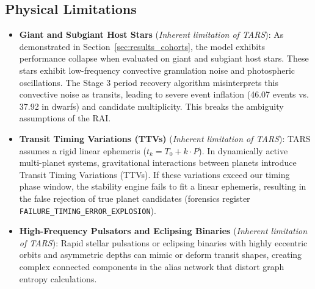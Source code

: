 \subsection{Physical Limitations} \label{sec:limit_physical}
\begin{itemize}
\item \textbf{Giant and Subgiant Host Stars} (\textit{Inherent limitation of TARS}): As demonstrated in Section~\ref{sec:results_cohorts}, the model exhibits performance collapse when evaluated on giant and subgiant host stars. These stars exhibit low-frequency convective granulation noise and photospheric oscillations. The Stage 3 period recovery algorithm misinterprets this convective noise as transits, leading to severe event inflation (46.07 events vs. 37.92 in dwarfs) and candidate multiplicity. This breaks the ambiguity assumptions of the RAI.
\item \textbf{Transit Timing Variations (TTVs)} (\textit{Inherent limitation of TARS}): TARS assumes a rigid linear ephemeris ($t_k = T_0 + k \cdot P$). In dynamically active multi-planet systems, gravitational interactions between planets introduce Transit Timing Variations (TTVs). If these variations exceed our timing phase window, the stability engine fails to fit a linear ephemeris, resulting in the false rejection of true planet candidates (forensics register \texttt{FAILURE\_TIMING\_ERROR\_EXPLOSION}).
\item \textbf{High-Frequency Pulsators and Eclipsing Binaries} (\textit{Inherent limitation of TARS}): Rapid stellar pulsations or eclipsing binaries with highly eccentric orbits and asymmetric depths can mimic or deform transit shapes, creating complex connected components in the alias network that distort graph entropy calculations.
\end{itemize}

